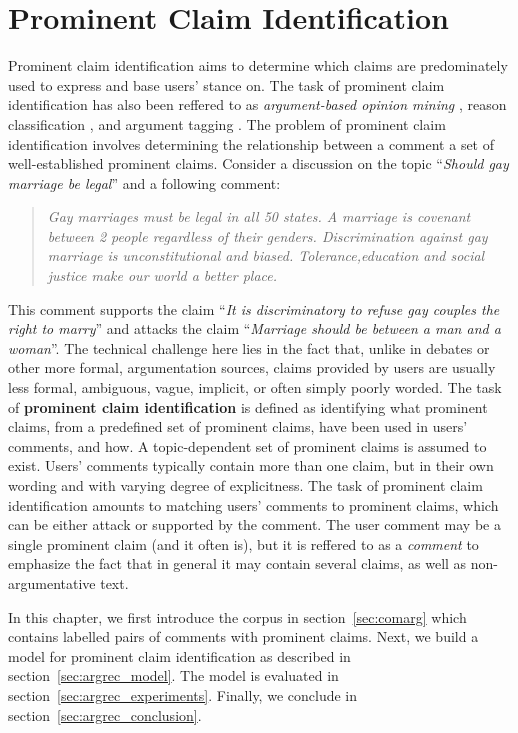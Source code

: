\chapter{Prominent Claim Identification}

Prominent claim identification aims to determine which claims are predominately
used to express and base users' stance on. The task of prominent claim
identification has also been reffered to as \textit{argument-based opinion mining}
\citep{boltuzic2014back}, reason classification \citep{hasan2014you}, and
argument tagging \citep{sobhani2015argumentation}. 
The problem of prominent claim identification involves determining
the relationship between a comment a set of well-established prominent claims. 
Consider a discussion on the topic ``\emph{Should gay marriage be legal}''
and a following comment: 
\begin{quote}
\emph{
Gay marriages must be legal in all 50 states. A marriage is covenant
between 2 people regardless of their genders. Discrimination against
gay marriage is unconstitutional and biased. Tolerance,education and
social justice make our world a better place.
}
\end{quote}
This comment supports the claim ``\emph{It is discriminatory to refuse
gay couples the right to marry}'' and attacks the claim
``\emph{Marriage should be between a man and a woman}''. 
The technical challenge here lies in the fact that, unlike
in debates or other more formal, argumentation sources, 
claims provided by users are usually less formal, ambiguous, vague, 
implicit, or often simply poorly worded. 
The task of \textbf{prominent claim identification} is defined 
as identifying what prominent claims, from a predefined set of prominent claims, 
have been used in users' comments, and how. 
A topic-dependent set of prominent claims is assumed to exist. 
Users' comments typically contain more than one claim, but in their 
own wording and with varying degree of explicitness. 
The task of prominent claim identification amounts to matching
users' comments to prominent claims, which can be either attack or 
supported by the comment. 
The user comment may be a single prominent claim (and it often is), but it 
is reffered to as a \textit{comment} to emphasize the fact that in general 
it may contain several claims, as well as non-argumentative text. 

In this chapter, we first introduce the \ComArg corpus in section~\ref{sec:comarg}
which contains labelled pairs of comments with prominent claims. Next, 
we build a model for prominent claim identification as described in 
section~\ref{sec:argrec_model}. The model is evaluated in 
section~\ref{sec:argrec_experiments}. Finally, we conclude in 
section~\ref{sec:argrec_conclusion}.

